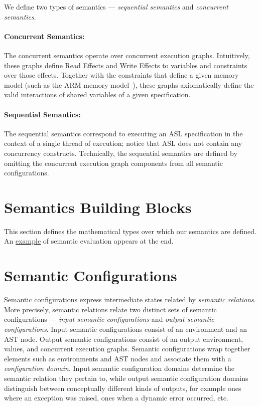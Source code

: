 We define two types of semantics --- \emph{sequential semantics} and \emph{concurrent semantics}.

\paragraph{Concurrent Semantics:}
The concurrent semantics operate over concurrent execution graphs.
Intuitively, these graphs define Read Effects and Write Effects to variables and constraints over those effects.
Together with the constraints that define a given memory model (such as the ARM memory model~\cite{AlglaveDGHM21}),
these graphs axiomatically define
the valid interactions of shared variables of a given specification.

\paragraph{Sequential Semantics:}
The sequential semantics correspond to executing an ASL specification in the context of a single thread
of execution; notice that ASL does not contain any concurrency constructs.
%
Technically, the sequential semantics are defined by omitting the concurrent execution graph components
from all semantic configurations.

\section{Semantics Building Blocks}
\label{sec:semanticsbuildingblocks}
This section defines the mathematical types over which our semantics are defined.
An \hyperlink{eval-example}{example} of semantic evaluation appears at the end.

\section{Semantic Configurations\label{sec:SemanticConfigurations}}

Semantic configurations express intermediate states related by \emph{semantic relations}.
%
More precisely, semantic relations relate two distinct sets of semantic configurations ---
\emph{input semantic configurations} and \emph{output semantic configurations}.
Input semantic configurations consist of an environment and an AST node.
Output semantic configurations consist of an output environment, values,
and concurrent execution graphs.
%
Semantic configurations wrap together elements such as environments and AST nodes
and associate them with a \emph{configuration domain}. Input semantic configuration domains
determine the semantic relation they pertain to, while output semantic configuration
domains distinguish between conceptually different kinds of outputs, for example
ones where an exception was raised, ones when a dynamic error occurred, etc.

